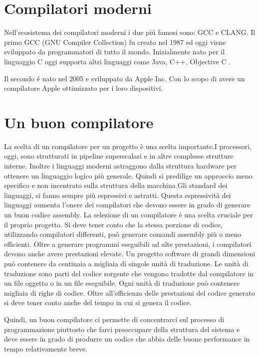 \documentclass[12pt, a4paper]{report}
\begin{document}
\section{Compilatori moderni}
Nell'ecosistema dei compilatori moderni i due pi\'u famosi sono: GCC e CLANG.
Il primo GCC (GNU Compiler Collection) fu creato nel 1987 ed oggi viene sviluppato da programmatori di tutto il mondo. Inizialmente nato per il linguaggio C oggi supporta altri linguaggi come Java, C++, Objective C \cite{GCCstory}.

Il secondo \'e nato nel 2005 e sviluppato da Apple Inc. Con lo scopo di avere un compilatore Apple ottimizzato per i loro dispositivi\cite{ClangStory}.

\section{Un buon compilatore} %
La scelta di un compilatore per un progetto è una scelta importante.I processori, oggi, sono strutturati in pipeline superscalari e in altre complesse strutture interne. Inoltre i linguaggi moderni astraggono dalla struttura hardware per ottenere un linguaggio logico più generale. Quindi si predilige un approccio meno specifico e non incentrato sulla struttura della macchina.Gli standard dei linguaggi, si fanno sempre più espressivi e astratti. Questa espressività dei linguaggi aumenta l'onere dei compilatori che devono essere in grado di generare un buon codice assembly. La selezione di un compilatore è una scelta cruciale per il proprio progetto. Si deve tener conto che la stessa porzione di codice, utilizzando compilatori differenti, può generare comandi assembly più o meno efficienti.
Oltre a generare programmi eseguibili ad alte prestazioni, i compilatori devono anche avere prestazioni elevate. Un progetto software di grandi dimensioni può contenere da centinaia a migliaia di singole unità di traduzione. Le unità di traduzione sono parti del codice sorgente che vengono tradotte dal compilatore in un file oggetto o in un file eseguibile. Ogni unità di traduzione può contenere migliaia di righe di codice. Oltre all'efficienza delle prestazioni del codice generato si deve tener conto anche del tempo in cui si genera il codice.

Quindi, un buon compilatore ci permette di concentrarci sul processo di programmazione piuttosto che farci preoccupare della struttura del sistema e deve essere in grado di produrre un codice che abbia delle buone performance in tempo relativamente breve.
\end{document}
